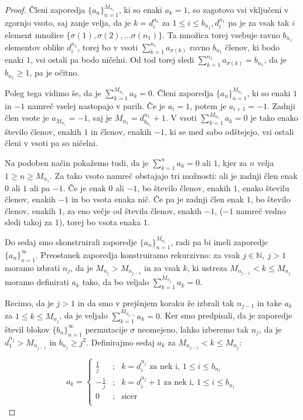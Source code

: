 \documentclass[12pt,a4paper,reqno]{amsart}
\theoremstyle{definition} %
\theoremstyle{plain} %
\newcommand{\N}{\mathbb N}
\begin{document}
\begin{proof}
Členi zaporedja $\{a_n\}^{M_{n_1}}_{n=1}$, ki so enaki $a_k=1$, so zagotovo vsi vključeni v zgornjo vsoto, saj zanje velja, da je $k=d_i^{n_1}$ za $1\leq i\leq b_{n_1}, d_i^{n_1}$ pa je za vsak tak $i$ element množice $\{ \sigma (1), \sigma (2), \ldots \sigma (n_1) \}$. Ta množica torej vsebuje ravno $b_{n_1}$ elementov oblike $d_i^{n_1}$, torej bo v vsoti $\sum_{k=1}^{n_1}a_{\sigma(k)}$ ravno $b_{n_1}$ členov, ki bodo enaki $1$, vsi ostali pa bodo ničelni. Od tod torej sledi $\sum_{k=1}^{n_1}a_{\sigma(k)}=b_{n_1}$, da je $b_{n_1}\geq 1$, pa je očitno.

Poleg tega vidimo še, da je $\sum_{k=1}^{M_{n_1}}a_k=0$. Členi zaporedja $\{a_n\}^{M_{n_1}}_{n=1}$, ki so enaki $1$ in $-1$ namreč vselej nastopajo v parih. Če je $a_i=1$, potem je $a_{i+1}=-1$. Zadnji člen vsote je $a_{M_{n_1}}=-1$, saj je $M_{n_1}=d_{b_{n_1}}^{n_1}+1$. V vsoti $\sum_{k=1}^{M_{n_1}}a_k=0$ je tako enako število členov, enakih $1$ in členov, enakih $-1$, ki se med sabo odštejejo, vsi ostali členi v vsoti pa so ničelni.

Na podoben način pokažemo tudi, da je $\sum_{k=1}^{n}a_k=0$ ali $1$, kjer za $n$ velja $1\geq n\geq M_{n_1}$. Za tako vsoto namreč obstajajo tri možnosti: ali je zadnji člen enak $0$ ali $1$ ali pa $-1$. Če je enak $0$ ali $-1$, bo število členov, enakih $1$, enako številu členov, enakih $-1$ in bo vsota enaka nič. Če pa je zadnji člen enak $1$, bo število členov, enakih $1$, za eno večje od števila členov, enakih $-1$, ($-1$ namreč vedno sledi takoj za $1$), torej bo vsota enaka $1$.

Do sedaj smo skonstruirali zaporedje $\{a_n\}^{M_{n_1}}_{n=1}$, radi pa bi imeli zaporedje $\{a_n\}^{\infty}_{n=1}$. Preostanek zaporedja konstruiramo rekurzivno: za vsak $j\in \N,\ j>1$ moramo izbrati $n_j$, da je $M_{n_j}>M_{n_{j-1}}$ in za vsak $k$, ki ustreza $M_{n_{j-1}}<k\leq M_{n_j}$ moramo definirati $a_k$ tako, da bo veljalo $\sum_{k=1}^{M_{n_j}}a_k=0$.

Recimo, da je $j>1$ in da smo v prejšnjem koraku že izbrali tak $n_{j-1}$ in take $a_k$ za $1\leq k\leq M_{n_j}$, da je veljalo $\sum_{k=1}^{M_{n_{j-1}}}a_k=0$. Ker smo predpisali, da je zaporedje števil blokov $\{b_n\}^{\infty}_{n=1}$ permutacije $\sigma$ neomejeno, lahko izberemo tak $n_j$, da je $d_1^{n_j}>M_{n_{j-1}}$ in $b_{n_j}\geq j^2$. %
Definirajmo sedaj $a_k$ za $M_{n_{j-1}}<k\leq M_{n_j}$:

$$a_k = 
\left\{ 
\begin{array}{ccc}
\frac{1}{j}&;&k=d_i^{n_j}\textrm{ za nek i, }1\leq i \leq b_{n_1}\\
-\frac{1}{j}&;&k=d_i^{n_j}+1\textrm{ za nek i, }1\leq i \leq b_{n_1}\\
0&;&\textrm{sicer}\\
\end{array}
\right. 
$$


\end{proof}
\end{document}
